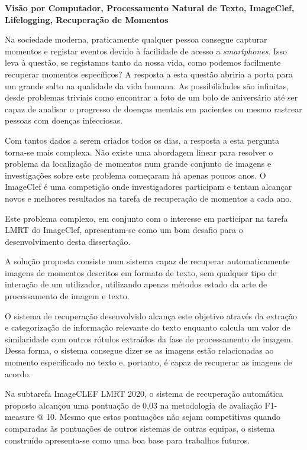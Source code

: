 \TitlePage
  \vspace*{55mm}
       {\textbf{Visão por Computador, Processamento Natural de Texto, ImageClef, Lifelogging, Recuperação de Momentos}}

          
      {Na sociedade moderna, praticamente qualquer pessoa consegue capturar momentos e registar eventos devido à facilidade de acesso a \textit{smartphones}. Isso leva à questão, se registamos tanto da nossa vida, como podemos facilmente recuperar momentos específicos? A resposta a esta questão abriria a porta para um grande salto na qualidade da vida humana. As possibilidades são infinitas, desde problemas triviais como encontrar a foto de um bolo de aniversário até ser capaz de analisar o progresso de doenças mentais em pacientes ou mesmo rastrear pessoas com doenças infecciosas.}

     \TEXT{}
     {Com tantos dados a serem criados todos os dias, a resposta a esta pergunta torna-se mais complexa. Não existe uma abordagem linear para resolver o problema da localização de momentos num grande conjunto de imagens e investigações sobre este problema começaram há apenas poucos anos. O ImageClef é uma competição onde investigadores participam e tentam alcançar novos e melhores resultados na tarefa de recuperação de momentos a cada ano.}

     \TEXT{}
     {Este problema complexo, em conjunto com o interesse em participar na tarefa LMRT do ImageClef, apresentam-se como um bom desafio para o desenvolvimento desta dissertação.}

     \TEXT{}
     {A solução proposta consiste num sistema capaz de recuperar automaticamente imagens de momentos descritos em formato de texto, sem qualquer tipo de interação de um utilizador, utilizando apenas métodos estado da arte de processamento de imagem e texto.} 

     \TEXT{}
     {O sistema de recuperação desenvolvido alcança este objetivo através da extração e categorização de informação relevante do texto enquanto calcula um valor de similaridade com outros rótulos extraídos da fase de processamento de imagem. Dessa forma, o sistema consegue dizer se as imagens estão relacionadas ao momento especificado no texto e, portanto, é capaz de recuperar as imagens de acordo.
     }

     \TEXT{}
     { Na subtarefa ImageCLEF LMRT 2020, o sistema de recuperação automática proposto alcançou uma pontuação de 0,03 na metodologia de avaliação F1-measure @ 10. Mesmo que estas pontuações não sejam competitivas quando comparadas às pontuações de outros sistemas de outras equipas, o sistema construído apresenta-se como uma boa base para trabalhos futuros.}



